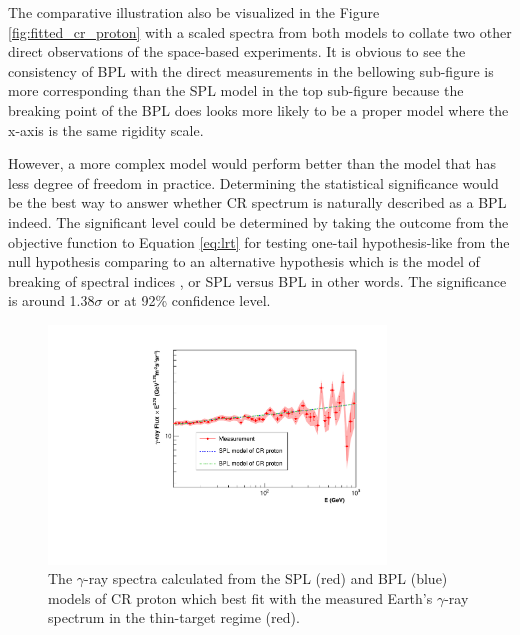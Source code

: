 The comparative illustration
also be visualized in the Figure \ref{fig:fitted_cr_proton} with a 
scaled spectra from both models to collate two other direct 
observations of the space-based experiments. It is obvious to see 
the consistency of BPL with the direct measurements in the bellowing 
sub-figure is more corresponding than the SPL model in the top sub-figure
because the breaking point of the BPL does looks more likely to be 
a proper model where the x-axis is the same rigidity scale.

However, a more complex model would perform better than the model 
that has less degree of freedom in practice. Determining the 
statistical significance would be the best way to answer whether 
CR spectrum is naturally described as a BPL indeed.
The significant level could be determined by
taking the outcome from the objective function
to Equation \ref{eq:lrt} for testing one-tail hypothesis-like
from the null hypothesis comparing to an alternative
hypothesis which is the model of breaking of spectral indices
, or SPL versus BPL in other words.
The significance is around 1.38$\sigma$ or
at 92\% confidence level.


\begin{figure}[h!]
    \centering
    \includegraphics[width=0.8\textwidth]{content/result_and_discussion/figures/fitted_result.pdf}
    \caption{
        The $\gamma$-ray spectra calculated from the SPL (red)
        and BPL (blue) models of CR proton which best fit with the
        measured Earth's $\gamma$-ray spectrum in the thin-target
        regime (red).
    }
    \label{fig:fitted_gamma_specgtrum}
\end{figure}

\newpage 

